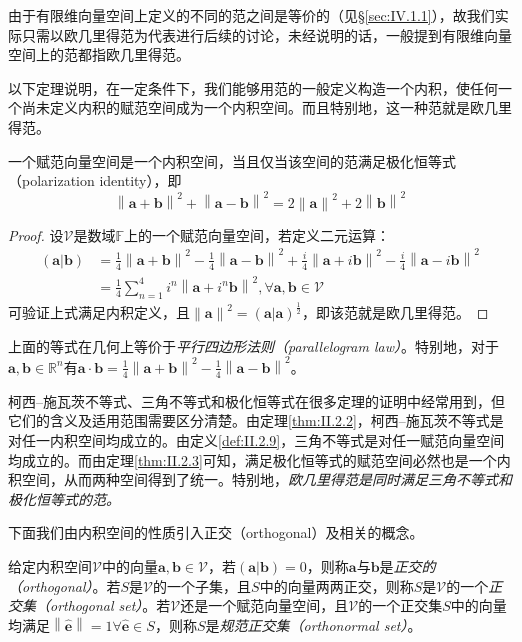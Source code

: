 \documentclass[../main.tex]{subfiles}
\begin{document}
由于有限维向量空间上定义的不同的范之间是等价的（见\S\ref{sec:IV.1.1}），故我们实际只需以欧几里得范为代表进行后续的讨论，未经说明的话，一般提到有限维向量空间上的范都指欧几里得范。

以下定理说明，在一定条件下，我们能够用范的一般定义构造一个内积，使任何一个尚未定义内积的赋范空间成为一个内积空间。而且特别地，这一种范就是欧几里得范。

\begin{theorem}\label{thm:II.2.3}
    一个赋范向量空间是一个内积空间，当且仅当该空间的范满足极化恒等式（polarization identity），即
    \[\left\|\mathbf{a}+\mathbf{b}\right\|^2+\left\|\mathbf{a}-\mathbf{b}\right\|^2=2\left\|\mathbf{a}\right\|^2+2\left\|\mathbf{b}\right\|^2\]
\end{theorem}
\begin{proof}
    设$\mathcal{V}$是数域$\mathbb{F}$上的一个赋范向量空间，若定义二元运算：
    \begin{align*}
        \left(\mathbf{a}|\mathbf{b}\right) & =\frac{1}{4}\left\|\mathbf{a}+\mathbf{b}\right\|^2-\frac{1}{4}\left\|\mathbf{a}-\mathbf{b}\right\|^2+\frac{i}{4}\left\|\mathbf{a}+i\mathbf{b}\right\|^2-\frac{i}{4}\left\|\mathbf{a}-i\mathbf{b}\right\|^2 \\
                                           & =\frac{1}{4}\sum_{n=1}^4i^n\left\|\mathbf{a}+i^n\mathbf{b}\right\|^2,\forall\mathbf{a},\mathbf{b}\in\mathcal{V}
    \end{align*}
    可验证上式满足内积定义，且$\left\|\mathbf{a}\right\|^2=\left(\mathbf{a}|\mathbf{a}\right)^{\frac{1}{2}}$，即该范就是欧几里得范。
\end{proof}

上面的等式在几何上等价于\emph{平行四边形法则（parallelogram law）}。特别地，对于$\mathbf{a},\mathbf{b}\in\mathbb{R}^n$有$\mathbf{a}\cdot\mathbf{b}=\frac{1}{4}\left\|\mathbf{a}+\mathbf{b}\right\|^2-\frac{1}{4}\left\|\mathbf{a}-\mathbf{b}\right\|^2$。

柯西--施瓦茨不等式、三角不等式和极化恒等式在很多定理的证明中经常用到，但它们的含义及适用范围需要区分清楚。由定理\ref{thm:II.2.2}，柯西--施瓦茨不等式是对任一内积空间均成立的。由定义\ref{def:II.2.9}，三角不等式是对任一赋范向量空间均成立的。而由定理\ref{thm:II.2.3}可知，满足极化恒等式的赋范空间必然也是一个内积空间，从而两种空间得到了统一。特别地，\emph{欧几里得范是同时满足三角不等式和极化恒等式的范。}

下面我们由内积空间的性质引入正交（orthogonal）及相关的概念。

\begin{definition}[正交]\label{def:II.3.3}
    给定内积空间$\mathcal{V}$中的向量$\mathbf{a},\mathbf{b}\in\mathcal{V}$，若$\left(\mathbf{a}|\mathbf{b}\right)=0$，则称$\mathbf{a}$与$\mathbf{b}$是\emph{正交的（orthogonal）}。若$S$是$\mathcal{V}$的一个子集，且$S$中的向量两两正交，则称$S$是$\mathcal{V}$的一个\emph{正交集（orthogonal set）}。若$\mathcal{V}$还是一个赋范向量空间，且$\mathcal{V}$的一个正交集$S$中的向量均满足$\left\|\hat{\mathbf{e}}\right\|=1\forall\hat{\mathbf{e}}\in S$，则称$S$是\emph{规范正交集（orthonormal set）}。
\end{definition}
\end{document}
